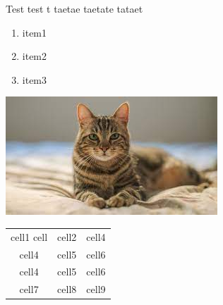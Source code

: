\documentclass{report}
\begin{document}

    Test test t
    taetae 
    taetate
    tataet

    \begin{enumerate}
        \item item1
        \item item2
        \item item3
    \end{enumerate}

    \includegraphics{../cat.jpg}

    \begin{tabular}{| c | c | c |}
    cell1 cell & cell2 & cell4 \\
    cell4 & cell5 & cell6 \\
    cell4 & cell5 & cell6 \\
    cell7 & cell8 & cell9  
   \end{tabular}
\end{document}
